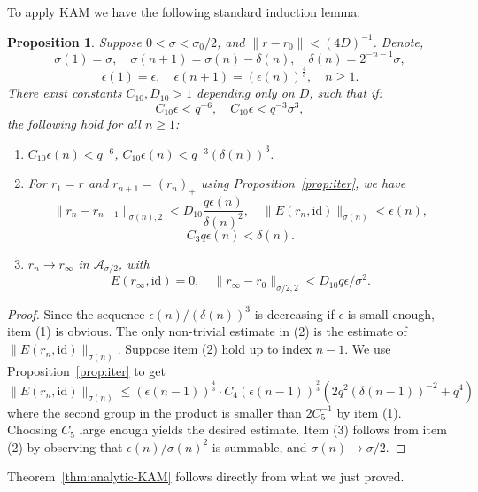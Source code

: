 \documentclass[12pt,reqno]{amsart}
\newtheorem{prop}[thm]{Proposition}
\theoremstyle{remark}
\begin{document}
To apply KAM we have the following standard induction lemma: 
\begin{prop}
Suppose $0 < \sigma < \sigma_0/2$, and $\|r - r_0\| < (4D)^{-1}$. Denote, 
\[
	\sigma(1) = \sigma, \quad \sigma(n+1) = \sigma(n) - \delta(n), \quad \delta(n) = 2^{-n-1}\sigma, 
\]
\[
	 \epsilon(1) = \epsilon, \quad \epsilon(n+1) = (\epsilon(n))^{\frac43}, \quad n \ge 1. 
\]
There exist constants $C_{10}, D_{10} > 1$ depending only on $D$, such that if:
\[
 C_{10} \epsilon < q^{-6}, \quad C_{10} \epsilon < q^{-3} \sigma^3, 
\]
the following hold for all $n \ge 1$:
\begin{enumerate}
 \item $C_{10} \epsilon(n) < q^{-6}$, $C_{10} \epsilon(n) < q^{-3} (\delta(n))^3$. 
 \item For $r_1 = r$ and $r_{n+1} = (r_n)_+$ using Proposition~\ref{prop:iter}, we have 
 	\[
		\|r_n- r_{n-1}\|_{\sigma(n), 2} < D_{10}\frac{q \epsilon(n)}{\delta(n)^2}, \quad \|E(r_n, {\mathrm{id}})\|_{\sigma(n)} < \epsilon(n),
	\] 
	\[
		C_3 q \epsilon(n) < \delta(n).
	\]
\item $r_n \to r_\infty$ in ${\mathcal{A}}_{\sigma/2}$, with
	\[
		E(r_\infty, {\mathrm{id}}) = 0, \quad \|r_\infty - r_0\|_{\sigma/2, 2} < D_{10} q \epsilon /\sigma^2. 
	\]  
\end{enumerate}
\end{prop}
\begin{proof}
Since the sequence $\epsilon(n)/(\delta(n))^3$ is decreasing if $\epsilon$ is small enough, item (1) is obvious. The only non-trivial estimate in (2) is the estimate of $\|E(r_n, {\mathrm{id}})\|_{\sigma(n)}$. Suppose item (2) hold up to index $n-1$.  We use Proposition~\ref{prop:iter} to get 
\[
	\|E(r_n, {\mathrm{id}})\|_{\sigma(n)} \le ( \epsilon(n-1))^{\frac43} \cdot C_4 (\epsilon(n-1))^{\frac23} \left( 2q^2 (\delta(n-1))^{-2} + q^4  \right) 
\]
where the second group in the product is smaller than $2 C_5^{-1}$ by item (1). Choosing $C_5$ large enough yields the desired estimate. Item (3) follows from item (2) by observing that $\epsilon(n)/\sigma(n)^2$  is summable, and $\sigma(n) \to \sigma/2$.  
\end{proof}

Theorem~\ref{thm:analytic-KAM} follows directly from what we just proved. 
\end{document}
